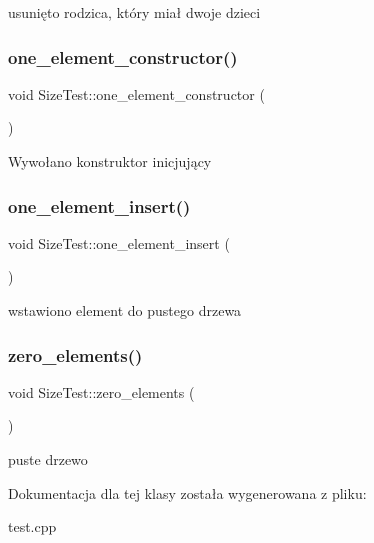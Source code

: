 usunięto rodzica, który miał dwoje dzieci \mbox{\label{class_size_test_a85261b7c20794c5d64335ca31cdf37cf}} 
\subsubsection{\texorpdfstring{one\+\_\+element\+\_\+constructor()}{one\_element\_constructor()}}
{\footnotesize\ttfamily void Size\+Test\+::one\+\_\+element\+\_\+constructor (\begin{DoxyParamCaption}{ }\end{DoxyParamCaption})\hspace{0.3cm}{\ttfamily [inline]}}

Wywołano konstruktor inicjujący \mbox{\label{class_size_test_a0aca43b07dd7f2dc7abb018193c7957a}} 
\subsubsection{\texorpdfstring{one\+\_\+element\+\_\+insert()}{one\_element\_insert()}}
{\footnotesize\ttfamily void Size\+Test\+::one\+\_\+element\+\_\+insert (\begin{DoxyParamCaption}{ }\end{DoxyParamCaption})\hspace{0.3cm}{\ttfamily [inline]}}

wstawiono element do pustego drzewa \mbox{\label{class_size_test_aaed7bed9e378c1d8f57b841b20f25caa}} 
\subsubsection{\texorpdfstring{zero\+\_\+elements()}{zero\_elements()}}
{\footnotesize\ttfamily void Size\+Test\+::zero\+\_\+elements (\begin{DoxyParamCaption}{ }\end{DoxyParamCaption})\hspace{0.3cm}{\ttfamily [inline]}}

puste drzewo 

Dokumentacja dla tej klasy została wygenerowana z pliku\+:\begin{DoxyCompactItemize}
\item 
test.\+cpp\end{DoxyCompactItemize}
